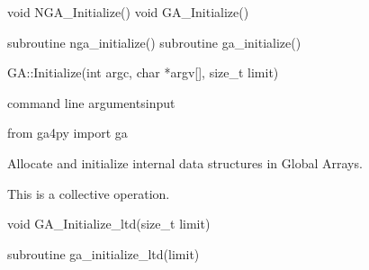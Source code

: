 \documentclass[12pt]{article}
\begin{document}


\begin{capi}
\begin{ccode}
void NGA_Initialize()
void GA_Initialize()
\end{ccode}
\end{capi}

\begin{fapi}
\begin{fcode}
subroutine nga_initialize()
subroutine ga_initialize()
\end{fcode}
\end{fapi}

\begin{cxxapi}
\begin{cxxcode}
GA::Initialize(int argc, char *argv[], size_t limit)
\end{cxxcode}
\begin{funcargs}
 {command line arguments}{input}
\end{funcargs}
\end{cxxapi}

\begin{pyapi}
\begin{pycode}
from ga4py import ga
\end{pycode}
\end{pyapi}

\gcoll

\begin{desc}

Allocate and initialize internal data structures in Global Arrays.

This is a collective operation.

\end{desc}



\begin{capi}
\begin{ccode}
void GA_Initialize_ltd(size_t limit)
\end{ccode}
\begin{funcargs}
\end{funcargs}
\end{capi}

\begin{fapi}
\begin{fcode}
subroutine ga_initialize_ltd(limit)
\end{fcode}
\begin{funcargs}
\end{funcargs}
\end{fapi}
\end{document}
